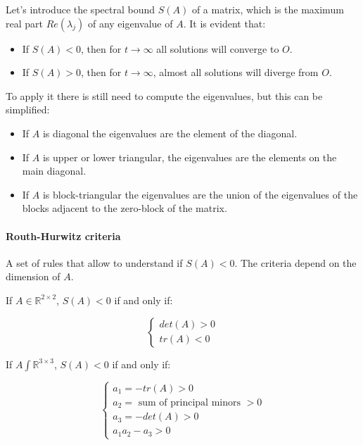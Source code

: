     Let's introduce the spectral bound $S(A)$ of a matrix, which is the maximum real part $Re(\lambda_j)$ of any eigenvalue of $A$.
    It is evident that:

    \begin{multicols}{2}
      \begin{itemize}
        \item If $S(A)<0$, then for $t\to\infty$ all solutions will converge to $O$.
        \item If $S(A) > 0$, then for $t\to\infty$, almost all solutions will diverge from $O$.
      \end{itemize}
    \end{multicols}

    To apply it there is still need to compute the eigenvalues, but this can be simplified:

    \begin{multicols}{2}
      \begin{itemize}
        \item If $A$ is diagonal the eigenvalues are the element of the diagonal.
        \item If $A$ is upper or lower triangular, the eigenvalues are the elements on the main diagonal.
        \item If $A$ is block-triangular the eigenvalues are the union of the eigenvalues of the blocks adjacent to the zero-block of the matrix.
      \end{itemize}
    \end{multicols}

      \paragraph{Routh-Hurwitz criteria}
      A set of rules that allow to understand if $S(A)<0$.
      The criteria depend on the dimension of $A$.

      \begin{multicols}{2}
        If $A\in\mathbb{R}^{2\times 2}$, $S(A)<0$ if and only if:

        $$\begin{cases}
          det(A) >0\\
          tr(A) < 0
        \end{cases}$$

        \columnbreak

        If $A\int\mathbb{R}^{3\times3}$, $S(A)<0$ if and only if:

        $$\begin{cases}
          a_1 = -tr(A) >0\\
          a_2 = \text{ sum of principal minors }>0\\
          a_3 = -det(A) >0\\
          a_1a_2-a_3 >0
        \end{cases}$$
      \end{multicols}

